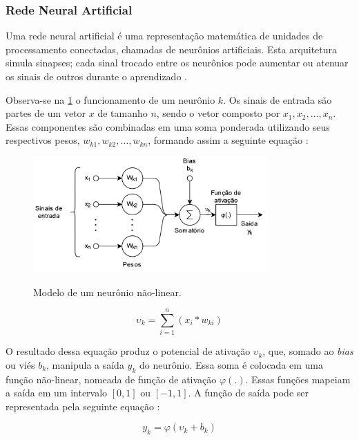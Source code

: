 \subsubsection{Rede Neural Artificial}

Uma rede neural artificial é uma representação matemática de unidades de processamento conectadas, chamadas de neurônios artificiais. Esta arquitetura simula sinapses; cada sinal trocado entre os neurônios pode aumentar ou atenuar os sinais de outros durante o aprendizado \cite{ml_and_dp}.

Observa-se na \cref{fig:neuronio} o funcionamento de um neurônio $k$. Os sinais de entrada são partes de um vetor $x$ de tamanho $n$, sendo o vetor composto por $x_1, x_2, \ldots, x_n$. Essas componentes são combinadas em uma soma ponderada utilizando seus respectivos pesos, $w_{k1}, w_{k2}, \ldots, w_{kn}$, formando assim a seguinte equação :

\begin{figure}[ht]
	\centering
	\caption{Modelo de um neurônio não-linear.}
	\includegraphics[width=0.8\textwidth]{figures/neuronio.png}
	\label{fig:neuronio}
\end{figure}

\begin{equation}
	\upsilon_k = \sum_{i=1}^n (x_i * w_{ki})
\end{equation}

O resultado dessa equação produz o potencial de ativação $\upsilon_k$, que, somado ao \textit{bias} ou viés $b_k$, manipula a saída $y_k$ do neurônio. Essa soma é colocada em uma função não-linear, nomeada de função de ativação $\varphi(.)$. Essas funções mapeiam a saída em um intervalo $[0, 1]$ ou $[-1, 1]$. A função de saída pode ser representada pela seguinte equação :

\begin{equation}
	y_k = \varphi(\upsilon_k + b_k)
\end{equation}

